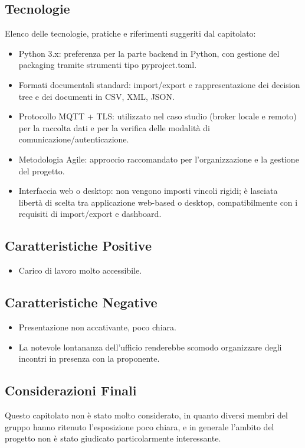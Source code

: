 \documentclass[a4paper,12pt]{article}
\begin{document}
    \subsection{Tecnologie}
    Elenco delle tecnologie, pratiche e riferimenti suggeriti dal capitolato:
    \begin{itemize}
        \item Python 3.x: preferenza per la parte backend in Python, con gestione del packaging tramite strumenti tipo pyproject.toml. 
        \item Formati documentali standard: import/export e rappresentazione dei decision tree e dei documenti in CSV, XML, JSON. 
        \item Protocollo MQTT + TLS: utilizzato nel caso studio (broker locale e remoto) per la raccolta dati e per la verifica delle modalità di comunicazione/autenticazione. 
        \item Metodologia Agile: approccio raccomandato per l’organizzazione e la gestione del progetto. 
        \item Interfaccia web o desktop: non vengono imposti vincoli rigidi; è lasciata libertà di scelta tra applicazione web-based o desktop, compatibilmente con i requisiti di import/export e dashboard.
    \end{itemize}
    \subsection{Caratteristiche Positive}
    \begin{itemize}
        \item Carico di lavoro molto accessibile.
    \end{itemize}
    \subsection{Caratteristiche Negative}
    \begin{itemize}
        \item Presentazione non accativante, poco chiara.
        \item La notevole lontananza dell'ufficio renderebbe scomodo organizzare degli incontri in presenza con la proponente.
    \end{itemize}
    \subsection{Considerazioni Finali}
    Questo capitolato non è stato molto considerato, in quanto diversi membri del gruppo hanno ritenuto l'esposizione poco chiara, e in generale l'ambito del progetto non è stato giudicato particolarmente interessante.
\end{document}
